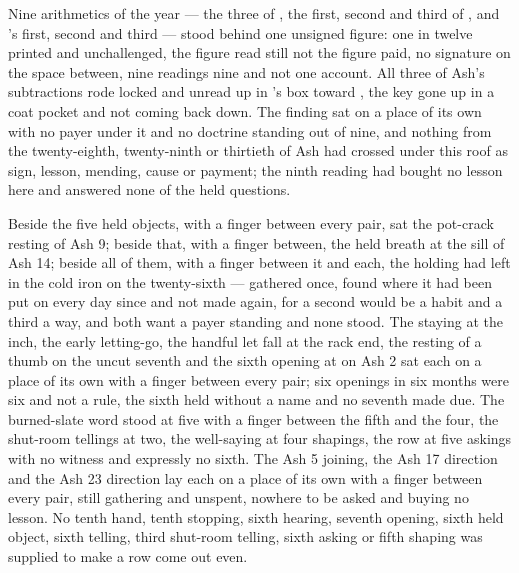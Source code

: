 Nine arithmetics of the year --- the three of , the first, second and third of , and 's first, second and third --- stood behind one unsigned figure: one in twelve printed and unchallenged, the figure read still not the figure paid, no signature on the space between, nine readings nine and not one account. All three of Ash's subtractions rode locked and unread up  in 's box toward , the key gone up in a coat pocket and not coming back down. The finding sat on a place of its own with no payer under it and no doctrine standing out of nine, and nothing from the twenty-eighth, twenty-ninth or thirtieth of Ash had crossed under this roof as sign, lesson, mending, cause or payment; the ninth reading had bought no lesson here and answered none of the held questions.

Beside the five held objects, with a finger between every pair, sat the pot-crack resting of Ash 9; beside that, with a finger between, the held breath at the sill of Ash 14; beside all of them, with a finger between it and each, the holding  had left in the cold iron on the twenty-sixth --- gathered once, found where it had been put on every day since and not made again, for a second would be a habit and a third a way, and both want a payer standing and none stood. The staying at the inch, the early letting-go, the handful let fall at the rack end, the resting of a thumb on the uncut seventh and the sixth opening at  on Ash 2 sat each on a place of its own with a finger between every pair; six openings in six months were six and not a rule, the sixth held without a name and no seventh made due. The burned-slate word stood at five with a finger between the fifth and the four, the shut-room tellings at two, the well-saying at four shapings, the row at five askings with no witness and expressly no sixth. The Ash 5 joining, the Ash 17 direction and the Ash 23 direction lay each on a place of its own with a finger between every pair, still gathering and unspent, nowhere to be asked and buying no lesson. No tenth hand, tenth stopping, sixth hearing, seventh opening, sixth held object, sixth telling, third shut-room telling, sixth asking or fifth shaping was supplied to make a row come out even.

